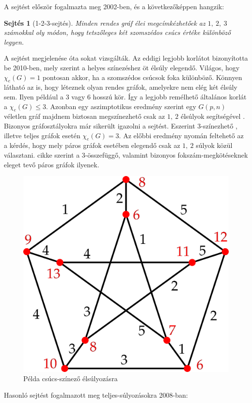 \documentclass[12pt, a4paper]{report}
\newtheorem{sej}[tét]{Sejtés}
\theoremstyle{remark}
\theoremstyle{definition}
\begin{document}
A sejtést először \citeauthor{Karonski2004} \cite{Karonski2004} fogalmazta meg 2002-ben, és a következőképpen hangzik: 

\begin{sej}[1-2-3-sejtés]
Minden rendes gráf élei megcímkézhetőek az $1,\ 2,\ 3$ számokkal oly módon, hogy tetszőleges két szomszédos csúcs értéke különböző legyen.
\end{sej}

A sejtést megjelenése óta sokat vizsgálták. Az eddigi legjobb korlátot \citeauthor{Kalkowski2010} \cite{Kalkowski2010} bizonyította be 2010-ben, mely szerint a helyes színezéshez öt élsúly elegendő. Világos, hogy $\chi_e(G) = 1$ pontosan akkor, ha a szomszédos csúcsok foka különböző. Könnyen látható az is, hogy léteznek olyan rendes gráfok, amelyekre nem elég két élsúly sem. Ilyen például a $3$ vagy $6$ hosszú kör. Így a legjobb remélhető általános korlát a $\chi_e(G) \leq 3$. Azonban egy aszimptotikus eredmény szerint egy $G(p, n)$ véletlen gráf majdnem biztosan megszínezhető csak az $1,\ 2$ élsúlyok segítségével \cite{AddarioBerry2008}. Bizonyos gráfosztályokra már sikerült igazolni a sejtést. Eszerint $3$-színezhető \cite{Karonski2004}, illetve teljes gráfok \cite{Alaeiyan2012} esetén $\chi_e(G) = 3$. Az előbbi eredmény nyomán feltehető az a kérdés, hogy mely páros gráfok esetében elegendő csak az $1,\ 2$ súlyok közül választani. \citeauthor{Lu2011} \cite{Lu2011} cikke szerint a $3$-összefüggő, valamint bizonyos fokszám-megkötéseknek eleget tevő páros gráfok ilyenek.

\begin{figure}[!h]
\centering
\includegraphics[width=0.5\linewidth]{./images/Petersen_jo}
\caption{Példa csúcs-színező élsúlyozásra}
\end{figure}

Hasonló sejtést fogalmazott meg teljes-súlyozásokra \citeauthor{Przybylo2010} 2008-ban:
\end{document}
